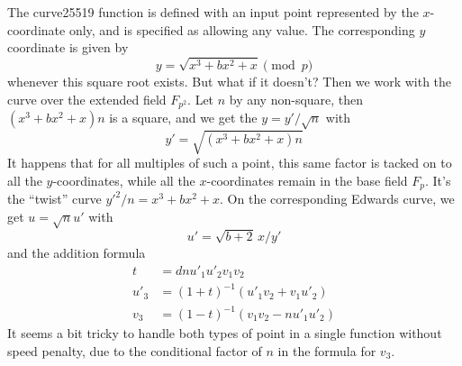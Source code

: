 \documentclass[a4paper]{article}
\begin{document}
The curve25519 function is defined with an input point represented by
the $x$-coordinate only, and is specified as allowing any value. The
corresponding $y$ coordinate is given by 
\begin{equation*}
  y = \sqrt{x^3 + b x^2 + x} \pmod p
\end{equation*}
whenever this square root exists. But what if it doesn't? Then we work
with the curve over the extended field $F_{p^2}$. Let $n$ by any
non-square, then $(x^3 + b x^2 + x) n$ is a square, and we get the
$y = y' / \sqrt{n}$ with
\begin{equation*}
  y' = \sqrt{(x^3 + b x^2 + x) n}
\end{equation*}
It happens that for all multiples of such a point, this same factor is
tacked on to all the $y$-coordinates, while all the $x$-coordinates
remain in the base field $F_p$. It's the ``twist'' curve $y'^2 / n =
x^3 + bx^2 + x$. On the corresponding Edwards curve, we
get $u = \sqrt{n} u'$ with
\begin{equation*}
  u' = \sqrt{b+2} \, x / y'
\end{equation*}
and the addition formula
\begin{align*}
  t &= d n u'_1 u'_2 v_1 v_2 \\
  u'_3 &= (1+t)^{-1}(u'_1v_2 + v_1 u'_2) \\
  v_3 &= (1-t)^{-1}(v_1 v_2 - n u'_1 u'_2)
\end{align*}
It seems a bit tricky to handle both types of point in a single
function without speed penalty, due to the conditional factor of $n$
in the formula for $v_3$.
\end{document}
